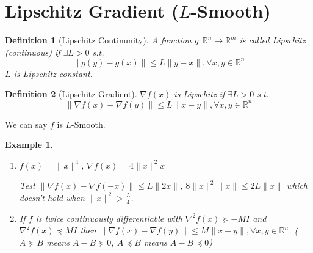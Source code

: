 \documentclass[11pt,a4paper]{article}
\newtheorem{example}{Example}
\newtheorem{definition}{Definition}
\begin{document}
\section{Lipschitz Gradient ($L$-Smooth)}
\begin{definition}[Lipschitz Continunity]
A function $g: \mathbb{R}^n \rightarrow	\mathbb{R}^m$ is called Lipschitz (continuous) if $\exists L>0$ s.t.
$$\|g(y)-g(x)\|\leq L\|y-x\|,\forall x,y\in \mathbb{R}^n$$
$L$ is Lipschitz constant.
\end{definition}

\begin{definition}[Lipschitz Gradient]
    $\nabla f(x)$ is Lipschitz if $\exists L>0$ s.t. $$\|\nabla f(x)-\nabla f(y)\|\leq L\|x-y\|,\forall x,y\in \mathbb{R}^n$$
\end{definition}
We can say $f$ is $L$-Smooth.

\begin{example}
    \quad

\begin{enumerate}
    \item $f(x)=\|x\|^4$, $\nabla f(x)=4\|x\|^2x$
    
    Test $\|\nabla f(x)-\nabla f(-x)\|\leq L\|2x\|$, $8\|x\|^2\|x\|\leq 2L\|x\|$ which doesn't hold when $\|x\|^2>\frac{L}{4}$.
    \item If $f$ is twice continuously differentiable with $\nabla^2 f(x)\succeq -MI$ and $\nabla^2 f(x)\preceq  MI$ then $\|\nabla f(x)-\nabla f(y)\|\leq M\|x-y\|,\forall x,y\in \mathbb{R}^n$. ($A\succeq B$ means $A-B\succeq 0$, $A\preceq B$ means $A-B\preceq 0$)
\end{enumerate}
\end{example}
\end{document}
